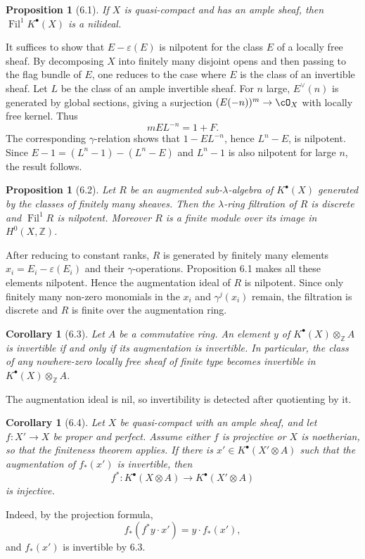 \documentclass[11pt]{article}
\theoremstyle{plain}
\newtheorem{proposition}[theorem]{Proposition}
\newtheorem{corollary}[theorem]{Corollary}
\theoremstyle{definition}
\theoremstyle{remark}
\newcommand{\ZZ}{\mathbb Z}
\providecommand{\Fil}{\operatorname{Fil}}
\begin{document}
\begin{proposition}[6.1]
If $X$ is quasi-compact and has an ample sheaf, then $\Fil^1K^{\bullet}(X)$ is a nilideal.
\end{proposition}

It suffices to show that $E-\varepsilon(E)$ is nilpotent for the class $E$ of a locally free sheaf. By decomposing $X$ into finitely many disjoint opens and then passing to the flag bundle of $E$, one reduces to the case where $E$ is the class of an invertible sheaf. Let $L$ be the class of an ample invertible sheaf. For $n$ large, $E^{\vee}(n)$ is generated by global sections, giving a surjection $(E(-n))^m\to\cO_X$ with locally free kernel. Thus
\[
mEL^{-n}=1+F.
\]
The corresponding $\gamma$-relation shows that $1-EL^{-n}$, hence $L^n-E$, is nilpotent. Since $E-1=(L^n-1)-(L^n-E)$ and $L^n-1$ is also nilpotent for large $n$, the result follows.

\begin{proposition}[6.2]
Let $R$ be an augmented sub-$\lambda$-algebra of $K^{\bullet}(X)$ generated by the classes of finitely many sheaves. Then the $\lambda$-ring filtration of $R$ is discrete and $\Fil^1R$ is nilpotent. Moreover $R$ is a finite module over its image in $H^0(X,\ZZ)$.
\end{proposition}

After reducing to constant ranks, $R$ is generated by finitely many elements $x_i=E_i-\varepsilon(E_i)$ and their $\gamma$-operations. Proposition 6.1 makes all these elements nilpotent. Hence the augmentation ideal of $R$ is nilpotent. Since only finitely many non-zero monomials in the $x_i$ and $\gamma^j(x_i)$ remain, the filtration is discrete and $R$ is finite over the augmentation ring.

\begin{corollary}[6.3]
Let $A$ be a commutative ring. An element $y$ of $K^{\bullet}(X)\otimes_{\ZZ}A$ is invertible if and only if its augmentation is invertible. In particular, the class of any nowhere-zero locally free sheaf of finite type becomes invertible in $K^{\bullet}(X)\otimes_{\ZZ}A$.
\end{corollary}
The augmentation ideal is nil, so invertibility is detected after quotienting by it.

\begin{corollary}[6.4]
Let $X$ be quasi-compact with an ample sheaf, and let $f:X'\to X$ be proper and perfect. Assume either $f$ is projective or $X$ is noetherian, so that the finiteness theorem applies. If there is $x'\in K^{\bullet}(X'\otimes A)$ such that the augmentation of $f_*(x')$ is invertible, then
\[
f^*:K^{\bullet}(X\otimes A)\to K^{\bullet}(X'\otimes A)
\]
is injective.
\end{corollary}
Indeed, by the projection formula,
\[
f_*(f^*y\cdot x')=y\cdot f_*(x'),
\]
and $f_*(x')$ is invertible by 6.3.
\end{document}
